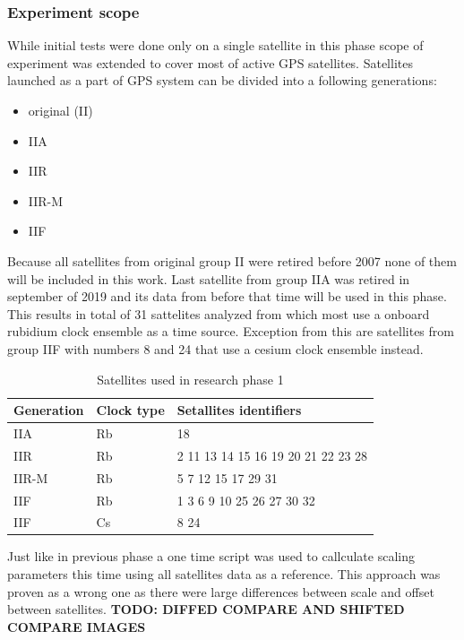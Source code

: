 \subsubsection{Experiment scope}
While initial tests were done only on a single satellite in this phase scope of experiment
was extended to cover most of active GPS satellites.
Satellites launched as a part of GPS system can be divided into a following generations:
\begin{itemize}
	\item original (II)
	\item IIA
	\item IIR
	\item IIR-M
	\item IIF
\end{itemize}
Because all satellites from original group II were retired before 2007 none of them will be 
included in this work. Last satellite from group IIA was retired in september of 2019 and its
data from before that time will be used in this phase.
This results in total of 31 sattelites analyzed from which most use a onboard rubidium clock
ensemble as a time source. Exception from this are satellites from group IIF with numbers 
8 and 24 that use a cesium clock ensemble instead.
\begin{table}[ht] 
	\centering
	\caption{Satellites used in research phase 1}
	\label{tab:sats_phase_1}
	\begin{tabular}{lll}
		\hline
		\hline
		Generation& Clock type& Setallites identifiers  \\
		\hline
		IIA& Rb& 18\\
		IIR& Rb& 2 11 13 14 15 16 19 20 21 22 23 28\\
		IIR-M& Rb& 5 7 12 15 17 29 31\\
		IIF& Rb& 1 3 6 9 10 25 26 27 30 32\\
		IIF& Cs& 8 24\\
		\hline
		\hline
	\end{tabular}
\end{table}
Just like in previous phase a one time script was used to callculate scaling parameters this 
time using all satellites data as a reference. This approach was proven as a wrong one as 
there were large differences between scale and offset between satellites.
\textbf{TODO: DIFFED COMPARE AND SHIFTED COMPARE IMAGES}

